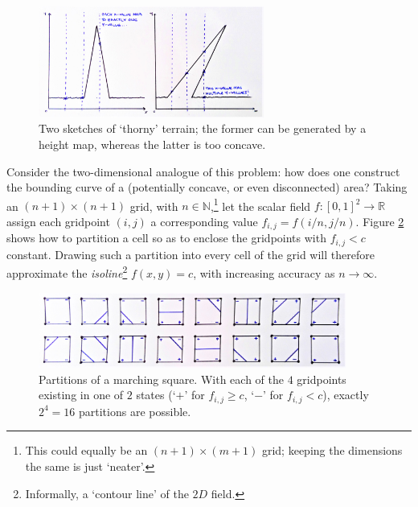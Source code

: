 \documentclass[a4paper, 11pt]{article}
\begin{document}
\begin{flushleft}
\begin{figure}[h]
\centering
\includegraphics[width=0.66\textwidth]{Concave Terrain}
\caption{Two sketches of `thorny' terrain; the former can be generated by a height map, whereas the latter is too concave.}
\label{Concave Terrain}
\end{figure}

Consider the two-dimensional analogue of this problem: how does one construct the bounding curve of a (potentially concave, or even disconnected) area? Taking an $(n+1) \times (n+1)$ grid, with $n \in \mathbb{N}$,\footnote{This could equally be an $(n+1) \times (m + 1)$ grid; keeping the dimensions the same is just `neater'.} let the scalar field $f : [0,1]^2 \rightarrow \mathbb{R}$ assign each gridpoint $(i,j)$ a corresponding value $f_{i,j} = f(i/n,j/n)$. Figure \ref{Marching Square Partitions} shows how to partition a cell so as to enclose the gridpoints with $f_{i,j} < c$ constant. Drawing such a partition into every cell of the grid will therefore approximate the \textit{isoline}\footnote{Informally, a `contour line' of the $2D$ field.} $f(x,y) = c$, with increasing accuracy as $n \rightarrow \infty$.%

\vspace{5pt}\noindent
\begin{figure}[h]
\centering
\includegraphics[width=0.9\textwidth]{Marching Square Partitions}
\caption{Partitions of a marching square. With each of the $4$ gridpoints existing in one of $2$ states (`$+$' for $f_{i,j} \geqslant c$, `$-$' for $f_{i,j} < c$), exactly $2^4 = 16$ partitions are possible.} %
\label{Marching Square Partitions}
\end{figure}


\end{flushleft}
\end{document}

